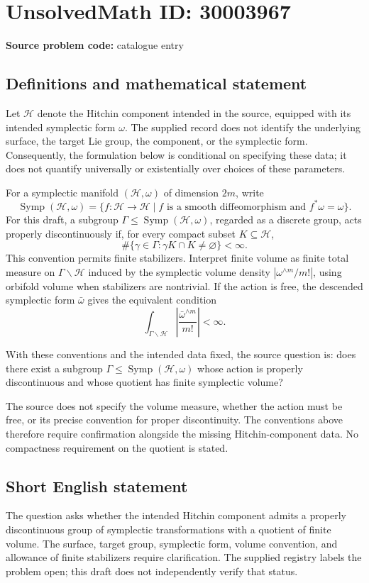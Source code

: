 \documentclass[11pt]{article}
\begin{document}
\section*{UnsolvedMath ID: 30003967}
\textbf{Source problem code:} catalogue entry
\subsection{Definitions and mathematical statement}
Let \(\mathcal H\) denote the Hitchin component intended in the source, equipped with its intended symplectic form \(\omega\). The supplied record does not identify the underlying surface, the target Lie group, the component, or the symplectic form. Consequently, the formulation below is conditional on specifying these data; it does not quantify universally or existentially over choices of these parameters.

For a symplectic manifold \((\mathcal H,\omega)\) of dimension \(2m\), write
\[
\operatorname{Symp}(\mathcal H,\omega)
=\{f:\mathcal H\longrightarrow\mathcal H\mid f\text{ is a smooth diffeomorphism and }f^*\omega=\omega\}.
\]
For this draft, a subgroup \(\Gamma\leq\operatorname{Symp}(\mathcal H,\omega)\), regarded as a discrete group, acts properly discontinuously if, for every compact subset \(K\subseteq\mathcal H\),
\[
\#\{\gamma\in\Gamma:\gamma K\cap K\neq\varnothing\}<\infty.
\]
This convention permits finite stabilizers. Interpret finite volume as finite total measure on \(\Gamma\backslash\mathcal H\) induced by the symplectic volume density \(\left|\omega^{\wedge m}/m!\right|\), using orbifold volume when stabilizers are nontrivial. If the action is free, the descended symplectic form \(\bar\omega\) gives the equivalent condition
\[
\int_{\Gamma\backslash\mathcal H}\left|\frac{\bar\omega^{\wedge m}}{m!}\right|<\infty.
\]

With these conventions and the intended data fixed, the source question is: does there exist a subgroup \(\Gamma\leq\operatorname{Symp}(\mathcal H,\omega)\) whose action is properly discontinuous and whose quotient has finite symplectic volume?

The source does not specify the volume measure, whether the action must be free, or its precise convention for proper discontinuity. The conventions above therefore require confirmation alongside the missing Hitchin-component data. No compactness requirement on the quotient is stated.
\subsection{Short English statement}
The question asks whether the intended Hitchin component admits a properly discontinuous group of symplectic transformations with a quotient of finite volume. The surface, target group, symplectic form, volume convention, and allowance of finite stabilizers require clarification. The supplied registry labels the problem open; this draft does not independently verify that status.
\end{document}
